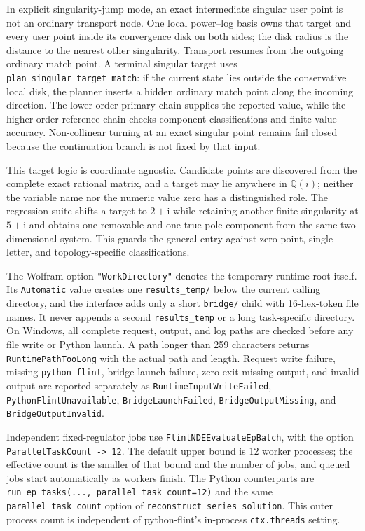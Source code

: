 \documentclass[11pt]{article}
\begin{document}
In explicit singularity-jump mode, an exact intermediate singular user point is not an
ordinary transport node.  One local power--log basis owns that target and every user point
inside its convergence disk on both sides; the disk radius is the distance to the nearest
other singularity.  Transport resumes from the outgoing ordinary match point.  A terminal
singular target uses \texttt{plan\_singular\_target\_match}: if the current state lies outside
the conservative local disk, the planner inserts a hidden ordinary match point along the
incoming direction.  The lower-order primary chain supplies the reported value, while the
higher-order reference chain checks component classifications and finite-value accuracy.
Non-collinear turning at an exact singular point remains fail closed because the continuation
branch is not fixed by that input.

This target logic is coordinate agnostic. Candidate points are discovered from the complete exact
rational matrix, and a target may lie anywhere in $\mathbb Q(i)$; neither the variable name nor the
numeric value zero has a distinguished role. The regression suite shifts a target to $2+\mathrm{i}$ while
retaining another finite singularity at $5+\mathrm{i}$ and obtains one removable and one true-pole component
from the same two-dimensional system. This guards the general entry against zero-point, single-letter,
and topology-specific classifications.

The Wolfram option \texttt{"WorkDirectory"} denotes the temporary runtime root itself.
Its \texttt{Automatic} value creates one \texttt{results\_temp/} below the current calling
directory, and the interface adds only a short \texttt{bridge/} child with 16-hex-token file
names.  It never appends a second \texttt{results\_temp} or a long task-specific directory.
On Windows, all complete request, output, and log paths are checked before any file write or
Python launch.  A path longer than 259 characters returns
\texttt{RuntimePathTooLong} with the actual path and length.  Request write failure,
missing \texttt{python-flint}, bridge launch failure, zero-exit missing output, and invalid
output are reported separately as \texttt{RuntimeInputWriteFailed},
\texttt{PythonFlintUnavailable}, \texttt{BridgeLaunchFailed},
\texttt{BridgeOutputMissing}, and \texttt{BridgeOutputInvalid}.

Independent fixed-regulator jobs use
\texttt{FlintNDE}\allowbreak\texttt{EvaluateEpBatch}, with the option
\texttt{Parallel}\allowbreak\texttt{TaskCount -> 12}.  The default upper bound is 12 worker processes; the
effective count is the smaller of that bound and the number of jobs, and queued jobs start
automatically as workers finish.  The Python counterparts are
\texttt{run\_ep\_tasks(..., parallel\_task\_count=12)} and the same
\texttt{parallel\_task\_count} option of \texttt{reconstruct\_series\_solution}.  This outer
process count is independent of python-flint's in-process \texttt{ctx.threads} setting.
\end{document}
